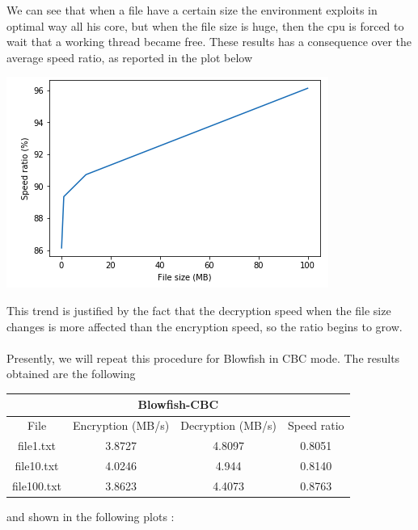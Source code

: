 \documentclass[11pt]{article}
\begin{document}
We can see that when a file have a certain size the environment exploits in optimal way all his core, but when the file size is huge, then the cpu is forced to wait that a working thread became free. These results has a consequence over the average speed ratio, as reported in the plot below 
\begin{center}
\includegraphics[scale=0.6]{./avg_speed_ratio_blowfish_ecb.png}
\end{center}
This trend is justified by the fact that the decryption speed when the file size changes is more affected than the encryption speed, so the ratio begins to grow.\\\\ Presently, we will repeat this procedure for Blowfish in CBC mode. The results obtained are the following
\begin{center}
\begin{tabular}{| c | c | c | c |}
\hline
\multicolumn{4}{|c|}{Blowfish-CBC} \\
\hline
File & Encryption (MB/s) & Decryption (MB/s) & Speed ratio\\
\hline
file1.txt & 3.8727 & 4.8097 & 0.8051 \\
\hline
file10.txt & 4.0246 & 4.944 & 0.8140 \\
\hline
file100.txt & 3.8623 & 4.4073 & 0.8763 \\
\hline
\end{tabular}
\end{center}
and shown in the following plots :
\end{document}
